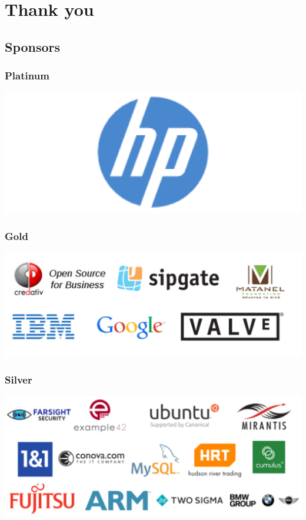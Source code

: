 \documentclass[t]{beamer}
\begin{document}
\section{Thank you}

\subsection{Sponsors}

\begin{frame}
	\frametitle{Platinum}
	\begin{center}
		\includegraphics[scale=0.4]{images2/sponsors/platinum/hp.pdf}
	\end{center}
\end{frame}

\begin{frame}
	\frametitle{Gold}
	\begin{center}
	\includegraphics[scale=0.5]{images2/sponsors/gold.pdf}
	\end{center}

\end{frame}

\begin{frame}
	\frametitle{Silver}
	\begin{center}
	\includegraphics[scale=0.5]{images2/sponsors/silver.pdf}
	\end{center}

\end{frame}
\end{document}
